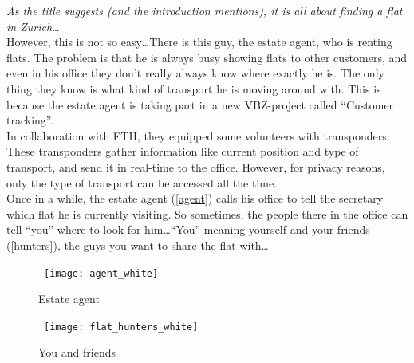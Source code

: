 \emph{As the title suggests (and the introduction mentions), it is all about finding a flat in Zurich\ldots}\\

However, this is not so easy\ldots There is this guy, the estate agent, who is renting flats. The problem is that he is always busy showing flats to other customers, and even in his office they don't really always know where exactly he is. The only thing they know is what kind of transport he is moving around with. This is because the estate agent is taking part in a new VBZ-project called ``Customer tracking''.\\

In collaboration with ETH, they equipped some volunteers with transponders. These transponders gather information like current position and type of transport, and send it in real-time to the office. However, for privacy reasons, only the type of transport can be accessed all the time.\\

Once in a while, the estate agent (\autoref{agent}) calls his office to tell the secretary which flat he is currently visiting. So sometimes, the people there in the office can tell ``you'' where to look for him\ldots ``You'' meaning yourself and your friends (\autoref{hunters}), the guys you want to share the flat with\ldots

\begin{figure}[h]
\centerline{\hbox{  
  \texttt{[image: agent\_white]}
  }}
\caption{Estate agent}
\label{agent}
\end{figure}

\begin{figure}[h]
  \centerline{\hbox{
    \texttt{[image: flat\_hunters\_white]}
  }}
\caption{You and friends}
\label{hunters}
\end{figure}

